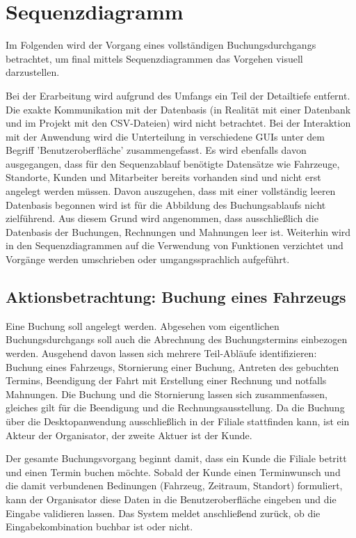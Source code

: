 \chapter{Sequenzdiagramm}

Im Folgenden wird der Vorgang eines vollständigen Buchungsdurchgangs betrachtet, um final mittels Sequenzdiagrammen das Vorgehen visuell darzustellen.

Bei der Erarbeitung wird aufgrund des Umfangs ein Teil der Detailtiefe entfernt. Die exakte Kommunikation mit der Datenbasis (in Realität mit einer Datenbank und im Projekt mit den CSV-Dateien) wird nicht betrachtet. Bei der Interaktion mit der Anwendung wird die Unterteilung in verschiedene GUIs unter dem Begriff 'Benutzeroberfläche' zusammengefasst. Es wird ebenfalls davon ausgegangen, dass für den Sequenzablauf benötigte Datensätze wie Fahrzeuge, Standorte, Kunden und Mitarbeiter bereits vorhanden sind und nicht erst angelegt werden müssen. Davon auszugehen, dass mit einer vollständig leeren Datenbasis begonnen wird ist für die Abbildung des Buchungsablaufs nicht zielführend. Aus diesem Grund wird angenommen, dass ausschließlich die Datenbasis der Buchungen, Rechnungen und Mahnungen leer ist. Weiterhin wird in den Sequenzdiagrammen auf die Verwendung von Funktionen verzichtet und Vorgänge werden umschrieben oder umgangssprachlich aufgeführt.

\section{Aktionsbetrachtung: Buchung eines Fahrzeugs}

Eine Buchung soll angelegt werden. Abgesehen vom eigentlichen Buchungsdurchgangs soll auch die Abrechnung des Buchungstermins einbezogen werden. Ausgehend davon lassen sich mehrere Teil-Abläufe identifizieren: Buchung eines Fahrzeugs, Stornierung einer Buchung, Antreten des gebuchten Termins, Beendigung der Fahrt mit Erstellung einer Rechnung und notfalls Mahnungen. Die Buchung und die Stornierung lassen sich zusammenfassen, gleiches gilt für die Beendigung und die Rechnungsausstellung. Da die Buchung über die Desktopanwendung ausschließlich in der Filiale stattfinden kann, ist ein Akteur der Organisator, der zweite Aktuer ist der Kunde.


Der gesamte Buchungsvorgang beginnt damit, dass ein Kunde die Filiale betritt und einen Termin buchen möchte. Sobald der Kunde einen Terminwunsch und die damit verbundenen Bedinungen (Fahrzeug, Zeitraum, Standort) formuliert, kann der Organisator diese Daten in die Benutzeroberfläche eingeben und die Eingabe validieren lassen. Das System meldet anschließend zurück, ob die Eingabekombination buchbar ist oder nicht.


